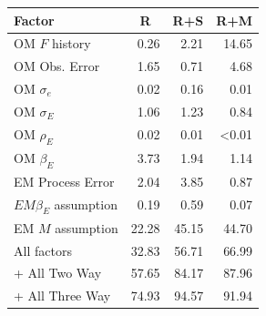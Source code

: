 \begin{center}
\begin{tabular}{lrrr}
\hline\hline
\multicolumn{1}{l}{Factor}&\multicolumn{1}{c}{R}&\multicolumn{1}{c}{R+S}&\multicolumn{1}{c}{R+M}\tabularnewline
\hline
OM $F$ history& 0.26& 2.21&14.65\tabularnewline
OM Obs. Error& 1.65& 0.71& 4.68\tabularnewline
OM $\sigma_e$& 0.02& 0.16& 0.01\tabularnewline
OM $\sigma_E$& 1.06& 1.23& 0.84\tabularnewline
OM $\rho_{E}$& 0.02& 0.01&\textless  0.01\tabularnewline
OM $\beta_{E}$& 3.73& 1.94& 1.14\tabularnewline
EM Process Error& 2.04& 3.85& 0.87\tabularnewline
$EM \beta_{E}$ assumption& 0.19& 0.59& 0.07\tabularnewline
EM $M$ assumption&22.28&45.15&44.70\tabularnewline
All factors&32.83&56.71&66.99\tabularnewline
+ All Two Way&57.65&84.17&87.96\tabularnewline
+ All Three Way&74.93&94.57&91.94\tabularnewline
\hline
\end{tabular}\end{center}
